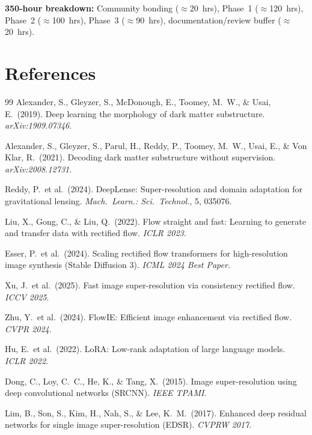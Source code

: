 \documentclass[11pt,a4paper]{article}
\begin{document}
\textbf{350-hour breakdown:} Community bonding ($\approx$20~hrs), Phase~1 ($\approx$120~hrs), Phase~2 ($\approx$100~hrs), Phase~3 ($\approx$90~hrs), documentation/review buffer ($\approx$20~hrs).

\vspace{6pt}

\section{References}

\begin{thebibliography}{99}
\small
{}
Alexander, S., Gleyzer, S., McDonough, E., Toomey, M.~W., \& Usai, E.\ (2019).
Deep learning the morphology of dark matter substructure.
\textit{arXiv:1909.07346}.

Alexander, S., Gleyzer, S., Parul, H., Reddy, P., Toomey, M.~W., Usai, E., \& Von Klar, R.\ (2021).
Decoding dark matter substructure without supervision.
\textit{arXiv:2008.12731}.

Reddy, P.\ et al.\ (2024).
DeepLense: Super-resolution and domain adaptation for gravitational lensing.
\textit{Mach.\ Learn.: Sci.\ Technol.}, 5, 035076.

Liu, X., Gong, C., \& Liu, Q.\ (2022).
Flow straight and fast: Learning to generate and transfer data with rectified flow.
\textit{ICLR 2023}.

Esser, P.\ et al.\ (2024).
Scaling rectified flow transformers for high-resolution image synthesis (Stable Diffusion 3).
\textit{ICML 2024 Best Paper}.

Xu, J.\ et al.\ (2025).
Fast image super-resolution via consistency rectified flow.
\textit{ICCV 2025}.

Zhu, Y.\ et al.\ (2024).
FlowIE: Efficient image enhancement via rectified flow.
\textit{CVPR 2024}.

Hu, E.\ et al.\ (2022).
LoRA: Low-rank adaptation of large language models.
\textit{ICLR 2022}.

Dong, C., Loy, C.~C., He, K., \& Tang, X.\ (2015).
Image super-resolution using deep convolutional networks (SRCNN).
\textit{IEEE TPAMI}.

Lim, B., Son, S., Kim, H., Nah, S., \& Lee, K.~M.\ (2017).
Enhanced deep residual networks for single image super-resolution (EDSR).
\textit{CVPRW 2017}.


\end{thebibliography}
\end{document}

